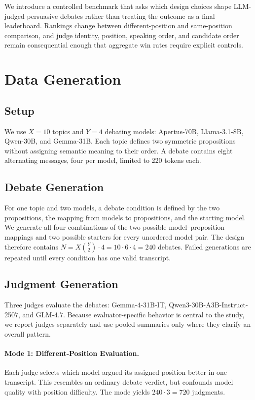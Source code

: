 \documentclass{article}
\begin{document}
We introduce a controlled benchmark that asks which design choices shape LLM-judged persuasive debates rather than treating the outcome as a final leaderboard. Rankings change between different-position and same-position comparison, and judge identity, position, speaking order, and candidate order remain consequential enough that aggregate win rates require explicit controls.


\section{Data Generation}


\subsection{Setup}

We use $X=10$ topics and $Y=4$ debating models: Apertus-70B, Llama-3.1-8B, Qwen-30B, and Gemma-31B. Each topic defines two symmetric propositions without assigning semantic meaning to their order. A debate contains eight alternating messages, four per model, limited to 220 tokens each.

\subsection{Debate Generation}
For one topic and two models, a debate condition is defined by the two propositions, the mapping from models to propositions, and the starting model. We generate all four combinations of the two possible model--proposition mappings and two possible starters for every unordered model pair. The design therefore contains $N=X\binom{Y}{2}\cdot4=10\cdot6\cdot4=240$ debates. Failed generations are repeated until every condition has one valid transcript.

\subsection{Judgment Generation}

Three judges evaluate the debates: Gemma-4-31B-IT, Qwen3-30B-A3B-Instruct-2507, and GLM-4.7. Because evaluator-specific behavior is central to the study, we report judges separately and use pooled summaries only where they clarify an overall pattern.

\paragraph{Mode 1: Different-Position Evaluation.}
Each judge selects which model argued its assigned position better in one transcript. This resembles an ordinary debate verdict, but confounds model quality with position difficulty. The mode yields $240\cdot3=720$ judgments.
\end{document}
